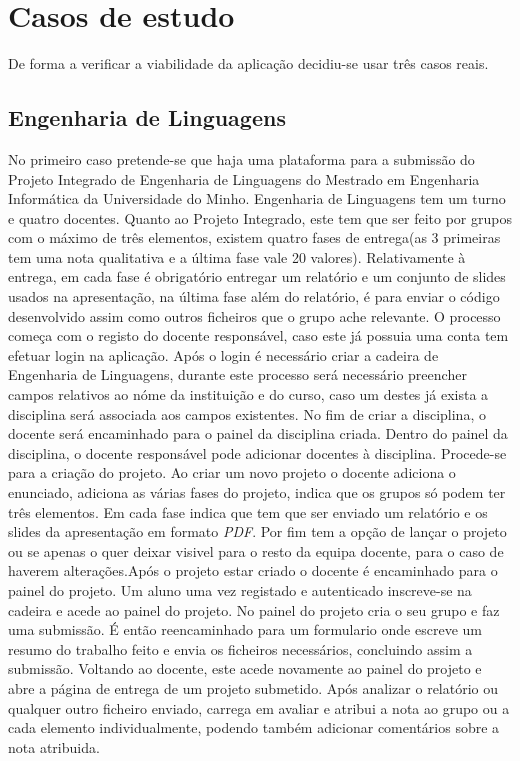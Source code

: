 \section{Casos de estudo}
De forma a verificar a viabilidade da aplicação decidiu-se usar três casos reais.

\subsection{Engenharia de Linguagens} %
\label{sub:engenharia_de_linguagens}


No primeiro caso pretende-se que haja uma plataforma para a submissão do Projeto Integrado de Engenharia de Linguagens do Mestrado em Engenharia Informática da Universidade do Minho.
Engenharia de Linguagens tem um turno e quatro docentes.
Quanto ao Projeto Integrado, este tem que ser feito por grupos com o máximo de três elementos, existem quatro fases de entrega(as 3 primeiras tem uma nota qualitativa e a última fase vale 20 valores). Relativamente à entrega, em cada fase é obrigatório entregar um relatório e um conjunto de slides usados na apresentação, na última fase além do relatório, é para enviar o código desenvolvido assim como outros ficheiros que o grupo ache relevante.
O processo começa com o registo do docente responsável, caso este já possuia uma conta tem efetuar login na aplicação. Após o login é necessário criar a cadeira de Engenharia de Linguagens, durante este processo será necessário preencher campos relativos ao nóme da instituição e do curso, caso um destes já exista a disciplina será associada aos campos existentes. No fim de criar a disciplina, o docente será encaminhado para o painel da disciplina criada. Dentro do painel da disciplina, o docente responsável pode adicionar docentes à disciplina.
Procede-se para a criação do projeto. Ao criar um novo projeto o docente adiciona o enunciado, adiciona as várias fases do projeto, indica que os grupos só podem ter três elementos. Em cada fase indica que tem que ser enviado um relatório e os slides da apresentação em formato \emph{PDF}. Por fim tem a opção de lançar o projeto ou se apenas o quer deixar visivel para o resto da equipa docente, para o caso de haverem alterações.Após o projeto estar criado o docente é encaminhado para o painel do projeto.
Um aluno uma vez registado e autenticado inscreve-se na cadeira e acede ao painel do projeto. No painel do projeto cria o seu grupo e faz uma submissão. É então reencaminhado para um formulario onde escreve um resumo do trabalho feito e envia os ficheiros necessários, concluindo assim a submissão.
Voltando ao docente, este acede novamente ao painel do projeto e abre a página de entrega de um projeto submetido. Após analizar o relatório ou qualquer outro ficheiro enviado, carrega em avaliar e atribui a nota ao grupo ou a cada elemento individualmente, podendo também adicionar comentários sobre a nota atribuida.


